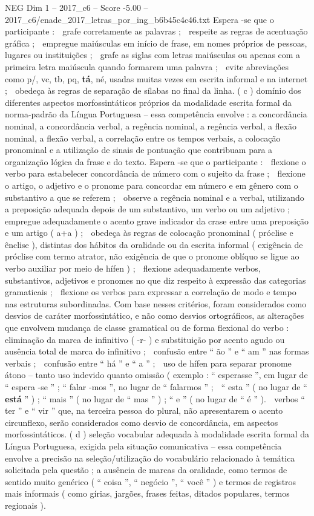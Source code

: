 \begin{textsample}{NEG Dim 1 – 2017\_c6 – Score -5.00 – 2017\_c6/enade\_2017\_letras\_por\_ing\_b6b45c4c46.txt}
Espera -se que o participante :  grafe corretamente as palavras ;  respeite as regras de acentuação gráfica ;  empregue maiúsculas em início de frase, em nomes próprios de pessoas, lugares ou instituições ;  grafe as siglas com letras maiúsculas ou apenas com a primeira letra maiúscula quando formarem uma palavra ;  evite abreviações como p/, vc, tb, pq, \textbf{tá}, né, usadas muitas vezes em escrita informal e na internet ;  obedeça às regras de separação de sílabas no final da linha. ( c ) domínio dos diferentes aspectos morfossintáticos próprios da modalidade escrita formal da norma-padrão da Língua Portuguesa – essa competência envolve : a concordância nominal, a concordância verbal, a regência nominal, a regência verbal, a flexão nominal, a flexão verbal, a correlação entre os tempos verbais, a colocação pronominal e a utilização de sinais de pontuação que contribuam para a organização lógica da frase e do texto.
Espera -se que o participante :  flexione o verbo para estabelecer concordância de número com o sujeito da frase ;  flexione o artigo, o adjetivo e o pronome para concordar em número e em gênero com o substantivo a que se referem ;  observe a regência nominal e a verbal, utilizando a preposição adequada depois de um substantivo, um verbo ou um adjetivo ;  empregue adequadamente o acento grave indicador da crase entre uma preposição e um artigo ( a+a ) ;  obedeça às regras de colocação pronominal ( próclise e ênclise ), distintas dos hábitos da oralidade ou da escrita informal ( exigência de próclise com termo atrator, não exigência de que o pronome oblíquo se ligue ao verbo auxiliar por meio de hífen ) ;  flexione adequadamente verbos, substantivos, adjetivos e pronomes no que diz respeito à expressão das categorias gramaticais ;  flexione os verbos para expressar a correlação de modo e tempo nas estruturas subordinadas.
Com base nesses critérios, foram considerados como desvios de caráter morfossintático, e não como desvios ortográficos, as alterações que envolvem mudança de classe gramatical ou de forma flexional do verbo :  eliminação da marca de infinitivo ( -r- ) e substituição por acento agudo ou ausência total de marca do infinitivo ;  confusão entre “ ão ” e “ am ” nas formas verbais ;  confusão entre “ há ” e “ a ” ;  uso de hífen para separar pronome átono – tanto uso indevido quanto omissão ( exemplo : “ esperasse ”, em lugar de “ espera -se ” ; “ falar -mos ”, no lugar de “ falarmos ” ;  “ esta ” ( no lugar de “ \textbf{está} ” ) ; “ mais ” ( no lugar de “ mas ” ) ; “ e ” ( no lugar de “ é ” ).  verbos “ ter ” e “ vir ” que, na terceira pessoa do plural, não apresentarem o acento circunflexo, serão considerados como desvio de concordância, em aspectos morfossintáticos. ( d ) seleção vocabular adequada à modalidade escrita formal da Língua Portuguesa, exigida pela situação comunicativa – essa competência envolve a precisão na seleção/utilização do vocabulário relacionado à temática solicitada pela questão ; a ausência de marcas da oralidade, como termos de sentido muito genérico ( “ coisa ”, “ negócio ”, “ você ” ) e termos de registros mais informais ( como gírias, jargões, frases feitas, ditados populares, termos regionais ).

\end{textsample}
